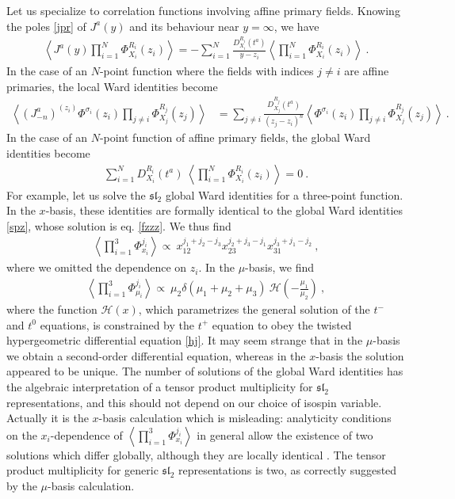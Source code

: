 \documentclass[12pt, a4paper, notitlepage, twoside]{report}
\numberwithin{equation}{section}
\theoremstyle{break}
\begin{document}
Let us specialize to correlation functions involving affine primary fields.
Knowing the poles \eqref{jpr} of $J^a(y)$ and its behaviour near $y=\infty$, we have
\begin{align}
 \left\langle J^a(y) \prod_{i=1}^N \Phi^{R_i}_{X_i}(z_i)\right\rangle = - \sum_{i=1}^N \frac{D^{R_i}_{X_i}(t^a)}{y-z_i}\left\langle \prod_{i=1}^N \Phi^{R_i}_{X_i}(z_i)\right\rangle\ .
\label{dja}
\end{align}
In the case of an $N$-point function where the fields with indices $j\neq i$ are affine primaries, the local Ward identities become
\begin{align}
\left\langle\left(J^a_{-n}\right)^{(z_i)}\Phi^{\sigma_i}(z_i)\prod_{j\neq i} \Phi^{R_j}_{X_j}(z_j)\right\rangle &=\sum_{j\neq i} \frac{D_{X_j}^{R_j}(t^a)}{(z_j-z_i)^n} \left\langle \Phi^{\sigma_i}(z_i)\prod_{j\neq i} \Phi^{R_j}_{X_j}(z_j)\right\rangle\ . 
\label{jmnz}
\end{align}
In the case of an $N$-point function of affine primary fields, the global Ward identities become
\begin{align}
 \sum_{i=1}^N D_{X_i}^{R_i}(t^a)\ \left\langle \prod_{i=1}^N \Phi^{R_i}_{X_i}(z_i)\right\rangle   = 0 \ .
\label{drxt}
\end{align}
For example, let us solve the $\mathfrak{sl}_2$ global Ward identities for a three-point function.
In the $x$-basis, these identities are formally identical to the global Ward identities \eqref{spz}, whose solution is eq. \eqref{fzzz}.
We thus find
\begin{align}
 \left\langle \prod_{i=1}^3 \Phi^{j_i}_{x_i} \right\rangle \propto\ x_{12}^{j_1+j_2-j_3} x_{23}^{j_2+j_3-j_1} x_{31}^{j_3+j_1-j_2}\ ,
\label{xxx}
\end{align}
where we omitted the dependence on $z_i$.
In the $\mu$-basis, we find 
\begin{align}
 \left\langle \prod_{i=1}^3\Phi^{j_i}_{\mu_i}\right\rangle \propto\ \mu_2\delta(\mu_1+\mu_2+\mu_3)\ \mathcal{H}\left(-\frac{\mu_1}{\mu_2}\right)\ ,
\label{pmf}
\end{align}
where the function $\mathcal{H}(x)$, which parametrizes the general solution of the $t^-$ and $t^0$ equations, is constrained by the $t^+$ equation to obey the twisted hypergeometric differential equation \eqref{hj}.
It may seem strange that in the $\mu$-basis we obtain a second-order differential equation, whereas in the $x$-basis the solution appeared to be unique.
The number of solutions of the global Ward identities has the algebraic interpretation of a tensor product multiplicity for $\mathfrak{sl}_2$ representations, and this should not depend on our choice of isospin variable.
Actually it is the $x$-basis calculation which is misleading: analyticity conditions on the $x_i$-dependence of $\left\langle \prod_{i=1}^3 \Phi^{j_i}_{x_i} \right\rangle$ in general allow the existence of two solutions which differ globally, although they are locally identical \cite{rib09}.
The tensor product multiplicity for generic $\mathfrak{sl}_2$ representations is two, as correctly suggested by the $\mu$-basis calculation. 
\end{document}
